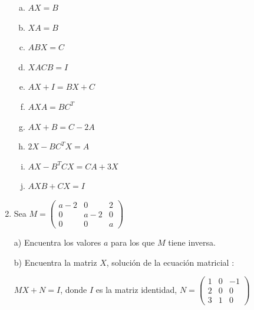 \begin{enumerate}
\begin{small}
\begin{multicols}{2}
\begin{enumerate}[a) ]
\item $AX=B$

\item $XA=B$

\item $ABX=C$

\item $XACB=I$

\item $AX+I=BX+C$

\item $AXA=BC^T$

\item $AX+B=C-2A$

\item $2X-BC^TX=A$

\item $AX-B^TCX=CA+3X$

\item $AXB+CX=I$
\end{enumerate}
\end{multicols}
\end{small} 

\footnotesize{}

\footnotesize{}

\footnotesize{\rightline{\textcolor{gris}{$X=\quad $ no se puede matricialmente }}}

\item \normalsize{Sea} $M=\left( \begin{matrix} a-2&0&2\\0&a-2&0\\0&0&a  \end{matrix} \right)$

a) Encuentra los valores $a$ para los que $M$ tiene inversa.

b) Encuentra la matriz $X$, solución de la ecuación matricial :

$MX+N=I$, donde $I$ es la matriz identidad, $N=\left( \begin{matrix} 1&0&-1\\2&0&0\\3&1&0 \end{matrix} \right)$


\end{enumerate}
